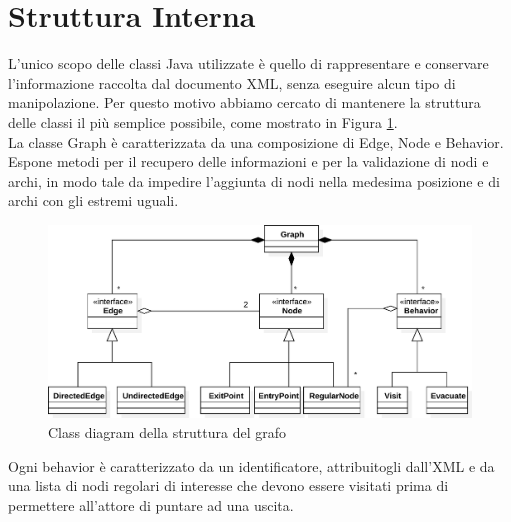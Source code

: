 \section{Struttura Interna}
L'unico scopo delle classi Java utilizzate è quello di rappresentare e conservare l'informazione raccolta dal documento XML, senza eseguire alcun tipo di manipolazione. Per questo motivo abbiamo cercato di mantenere la struttura delle classi il più semplice possibile, come mostrato in Figura \ref{fig:graph-diagram}.\\
La classe Graph è caratterizzata da una composizione di Edge, Node e Behavior. Espone metodi per il recupero delle informazioni e per la validazione di nodi e archi, in modo tale da impedire l'aggiunta di nodi nella medesima posizione e di archi con gli estremi uguali.\\ 
\begin{figure}[htbp]
\centering
\includegraphics[width=\textwidth,height=\textheight,keepaspectratio]{images/graph-diagram.pdf}
\caption{Class diagram della struttura del grafo}
\label{fig:graph-diagram}
\end{figure}
Ogni behavior è caratterizzato da un identificatore, attribuitogli dall'XML e da una lista di nodi regolari di interesse che devono essere visitati prima di permettere all'attore di puntare ad una uscita. 

